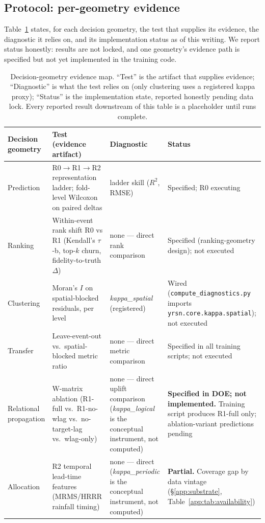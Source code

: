 \subsection{Protocol: per-geometry evidence}
\label{app:protocol}
Table~\ref{app:tab:evidence-map} states, for each decision geometry, the
test that supplies its evidence, the diagnostic it relies on, and its
implementation status as of this writing. We report status honestly:
results are not locked, and one geometry's evidence path is specified but
not yet implemented in the training code.

\begin{table}[t]
\centering
\caption{Decision-geometry evidence map. ``Test'' is the artifact that
  supplies evidence; ``Diagnostic'' is what the test relies on (only
  clustering uses a registered kappa proxy); ``Status'' is the
  implementation state, reported honestly pending data lock. Every
  reported result downstream of this table is a placeholder until runs
  complete.}
\label{app:tab:evidence-map}
\small
\begin{tabular}{@{}p{2.5cm}p{4.3cm}p{3.4cm}p{4.2cm}@{}}
\toprule
\textbf{Decision geometry} & \textbf{Test (evidence artifact)} & \textbf{Diagnostic} & \textbf{Status} \\
\midrule
Prediction &
  R0$\to$R1$\to$R2 representation ladder; fold-level Wilcoxon on paired deltas &
  ladder skill ($R^2$, RMSE) &
  Specified; R0 executing \\[3pt]
Ranking &
  Within-event rank shift R0 vs R1 (Kendall's $\tau$-b, top-$k$ churn, fidelity-to-truth $\Delta$) &
  none --- direct rank comparison &
  Specified (ranking-geometry design); not executed \\[3pt]
Clustering &
  Moran's $I$ on spatial-blocked residuals, per level &
  \textit{kappa\_spatial} (registered) &
  Wired (\texttt{compute\_diagnostics.py} imports \texttt{yrsn.core.kappa.spatial}); not executed \\[3pt]
Transfer &
  Leave-event-out vs.\ spatial-blocked metric ratio &
  none --- direct metric comparison &
  Specified in all training scripts; not executed \\[3pt]
Relational propagation &
  W-matrix ablation (R1-full vs.\ R1-no-wlag vs.\ no-target-lag vs.\ wlag-only) &
  none --- direct uplift comparison (\textit{kappa\_logical} is the conceptual instrument, not computed) &
  \textbf{Specified in DOE; not implemented.} Training script produces R1-full only; ablation-variant predictions pending \\[3pt]
Allocation &
  R2 temporal lead-time features (MRMS/HRRR rainfall timing) &
  none --- direct (\textit{kappa\_periodic} is the conceptual instrument, not computed) &
  \textbf{Partial.} Coverage gap by data vintage (\S\ref{app:substrate}, Table~\ref{app:tab:availability}) \\
\bottomrule
\end{tabular}
\end{table}

